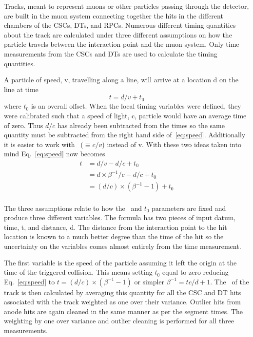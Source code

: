 Tracks, meant to represent muons or other particles passing through the detector, are built in the muon system connecting together the hits in the different chambers of
the CSCs, DTs, and RPCs. Numerous different timing quantities about the track are calculated under three different assumptions on how the particle
travels between the interaction point and the muon system. Only time measurements from the CSCs and DTs are used to calculate the timing quantities.

A particle of speed, v, travelling along a line, will arrive at a location d
on the line at time
\begin{equation}
t = d/v + t_0
\label{eq:speed}
\end{equation}
where $t_0$ is an overall offset. When the local timing variables were defined, they were calibrated such that a speed of light, c, particle would have an average time
of zero. Thus $d/c$ has already been subtracted from the times so the same quantity must be subtracted from the right hand side of~\ref{eq:speed}.
Additionally it is easier to work with \invbeta\ ($\equiv{c/v}$) instead of v. With these two ideas taken into mind Eq.~\ref{eq:speed} now becomes
\begin{equation}
\begin{split}
t &= d/v - d/c + t_0 \\
 &= d \times \beta^{-1} / c - d/c + t_0 \\
 &= (d / c) \times (\beta^{-1} - 1) + t_0 \\
\end{split}
\label{eq:speed}
\end{equation}

The three assumptions relate to how the \invbeta\ and $t_0$ parameters are fixed and produce three different variables. 
The formula has two pieces of input datum, time, t, and distance, d. The distance
from the interaction point to the hit location is known to a much better degree than the time of the hit so the uncertainty on the variables comes 
almost entirely from the time measurement.

The first variable is the speed of the particle assuming it left the origin at the time of the triggered collision.
This means setting $t_0$ equal to zero reducing Eq.~\ref{eq:speed} to $t = (d / c) \times (\beta^{-1} - 1)$ or simpler
$\beta^{-1} = tc/d + 1$. The \invbeta\ of the track is then calculated by averaging this quantity for all the
CSC and DT hits associated with the track weighted as one over their variance.
Outlier hits from anode hits are again cleaned in the same manner as per the segment times. The weighting by one over variance and 
outlier cleaning is performed for all three measurements.

